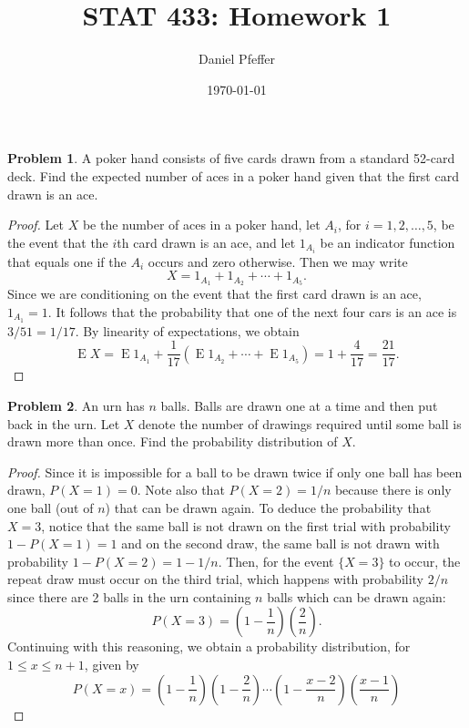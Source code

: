 \documentclass[oneside,reqno]{amsart}
\title{STAT 433: Homework 1}
\author{Daniel Pfeffer}
\date{\today}
\DeclareMathOperator{\E}{\mathrm{E}}
\theoremstyle{definition}
\newtheorem{prob}{Problem}
\begin{document}
\maketitle


\begin{prob}
A poker hand consists of five cards drawn from a standard 52-card deck. Find the expected number of aces in a poker hand given that the first card drawn is an ace.
\end{prob}


\begin{proof}
Let $X$ be the number of aces in a poker hand, let $A_i$, for $i=1,2,\dotsc,5$, be the event that the $i$th card drawn is an ace, and let $1_{A_i}$ be an indicator function that equals one if the $A_i$ occurs and zero otherwise. Then we may write
\[
	X = 1_{A_1} + 1_{A_2} + \cdots + 1_{A_5}.
\]
Since we are conditioning on the event that the first card drawn is an ace, $1_{A_1} = 1$. It follows that the probability that one of the next four cars is an ace is $3/51 = 1/17$. By linearity of expectations, we obtain
\[
	\E X = \E 1_{A_1}  + \frac{1}{17} (\E 1_{A_2} + \cdots + \E 1_{A_5})   
	= 1 + \frac{4}{17} 
	= \frac{21}{17}.
\]
\end{proof}


\begin{prob}
An urn has $n$ balls. Balls are drawn one at a time and then put back in the urn. Let $X$ denote the number of drawings required until some ball is drawn more than once. Find the probability distribution of $X$.
\end{prob}

\begin{proof}
Since it is impossible for a ball to be drawn twice if only one ball has been drawn, $P(X=1) = 0$. Note also that $P(X=2) = 1/n$ because there is only one ball (out of $n$) that can be drawn again. To deduce the probability that $X=3$, notice that the same ball is not drawn on the first trial with probability $1-P(X=1) = 1$ and on the second draw, the same ball is not drawn with probability $1-P(X=2) = 1-1/n$. Then, for the event $\{X=3\}$ to occur, the repeat draw must occur on the third trial, which happens with probability $2/n$ since there are 2 balls in the urn containing $n$ balls which can be drawn again:
\[
	P(X=3) =\left(1 - \frac{1}{n}\right)\left( \frac{2}{n}\right).
\]
Continuing with this reasoning, we obtain a probability distribution, for $1 \leq x \leq n+1$, given by
\[
	P(X=x) =\left(1-\frac{1}{n}\right)\left(1-\frac{2}{n}\right) \cdots\left(1-\frac{x-2}{n}\right) \left(\frac{x-1}{n}\right)
\]
\end{proof}
\end{document}

